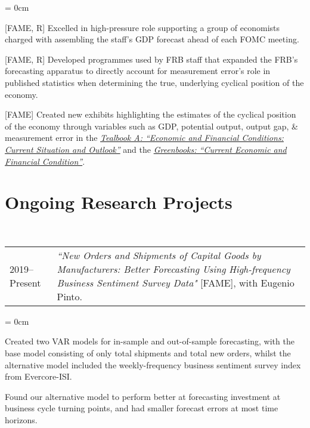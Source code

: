 \documentclass[a4paper, 11pt]{article}
\begin{document}
    \begin{compactitem}\parskip = 0cm
      \item {[FAME, R]} Excelled in high-pressure role supporting a group of economists charged with assembling the staff's GDP forecast ahead of each FOMC meeting.
      \item {[FAME, R]} Developed programmes used by FRB staff that expanded the FRB's forecasting apparatus to directly account for measurement error's role in published statistics when determining the true, underlying cyclical position of the economy.
      \item {[FAME]} Created new exhibits highlighting the estimates of the cyclical position of the economy through variables such as GDP, potential output, output gap, \& measurement error in the \href{https://www.federalreserve.gov/monetarypolicy/fomc_historical.htm#tealbooks}{\textit{Tealbook A: ``Economic and Financial Conditions: Current Situation and Outlook''}} and the \href{https://www.federalreserve.gov/monetarypolicy/fomc_historical.htm#greenbooks}{\textit{Greenbooks: ``Current Economic and Financial Condition''}}.
    \end{compactitem}

  \section{Ongoing Research Projects}
    ~\begin{tabular}{lP{15cm}}
      2019--Present & \textit{``New Orders and Shipments of Capital Goods by Manufacturers: Better Forecasting Using} \textit{High-frequency Business Sentiment Survey Data"} {[FAME]}, with Eugenio Pinto.
    \end{tabular}

    \begin{compactitem}\parskip = 0cm
      \item Created two VAR models for in-sample and out-of-sample forecasting, with the base model consisting of only total shipments and total new orders, whilst the alternative model included the weekly-frequency business sentiment survey index from Evercore-ISI.
      \item Found our alternative model to perform better at forecasting investment at business cycle turning points, and had smaller forecast errors at most time horizons.
    \end{compactitem}
\end{document}
